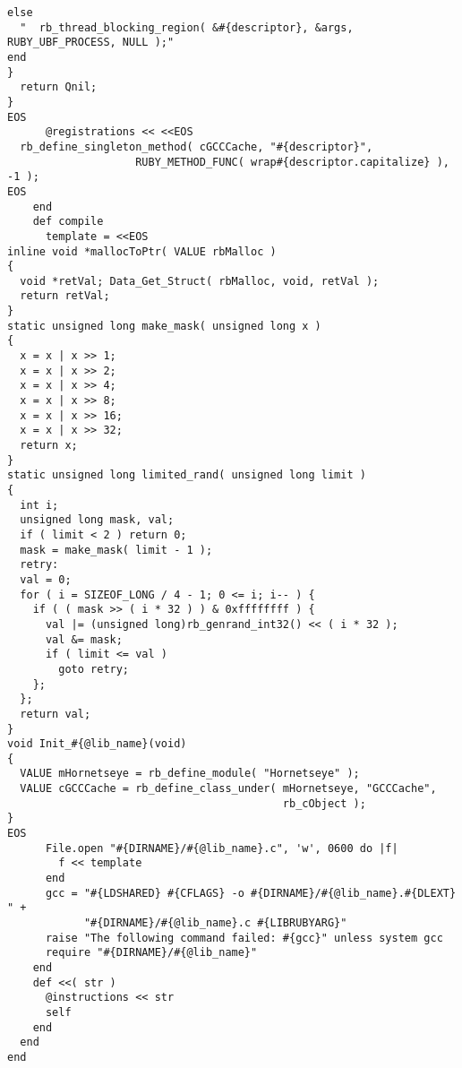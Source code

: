 \begin{lstlisting}
else
  "  rb_thread_blocking_region( &#{descriptor}, &args, RUBY_UBF_PROCESS, NULL );"
end
}
  return Qnil;
}
EOS
      @registrations << <<EOS
  rb_define_singleton_method( cGCCCache, "#{descriptor}",
                    RUBY_METHOD_FUNC( wrap#{descriptor.capitalize} ), -1 ); 
EOS
    end
    def compile
      template = <<EOS
inline void *mallocToPtr( VALUE rbMalloc )
{
  void *retVal; Data_Get_Struct( rbMalloc, void, retVal );
  return retVal;
}
static unsigned long make_mask( unsigned long x )
{
  x = x | x >> 1;
  x = x | x >> 2;
  x = x | x >> 4;
  x = x | x >> 8;
  x = x | x >> 16;
  x = x | x >> 32;
  return x;
}
static unsigned long limited_rand( unsigned long limit )
{
  int i;
  unsigned long mask, val;
  if ( limit < 2 ) return 0;
  mask = make_mask( limit - 1 );
  retry:
  val = 0;
  for ( i = SIZEOF_LONG / 4 - 1; 0 <= i; i-- ) {
    if ( ( mask >> ( i * 32 ) ) & 0xffffffff ) {
      val |= (unsigned long)rb_genrand_int32() << ( i * 32 );
      val &= mask;
      if ( limit <= val )
        goto retry;
    };
  };
  return val;
}
void Init_#{@lib_name}(void)
{
  VALUE mHornetseye = rb_define_module( "Hornetseye" );
  VALUE cGCCCache = rb_define_class_under( mHornetseye, "GCCCache",
                                           rb_cObject );
}
EOS
      File.open "#{DIRNAME}/#{@lib_name}.c", 'w', 0600 do |f|
        f << template
      end
      gcc = "#{LDSHARED} #{CFLAGS} -o #{DIRNAME}/#{@lib_name}.#{DLEXT} " +
            "#{DIRNAME}/#{@lib_name}.c #{LIBRUBYARG}"
      raise "The following command failed: #{gcc}" unless system gcc
      require "#{DIRNAME}/#{@lib_name}"
    end
    def <<( str )
      @instructions << str
      self
    end
  end
end
\end{lstlisting}
